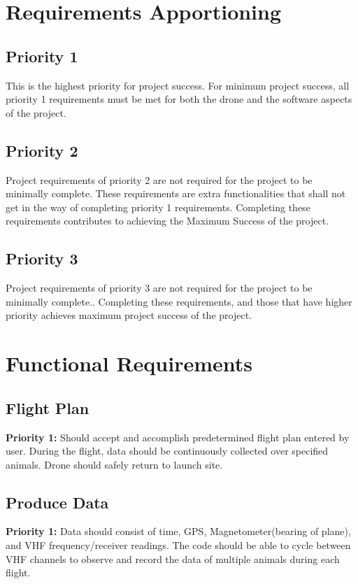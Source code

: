 \documentclass[onecolumn, draftclsnofoot,10pt, compsoc]{IEEEtran}
\begin{document}
\section{Requirements Apportioning}
\subsection{Priority 1}
This is the highest priority for project success. For minimum project success, all priority 1 requirements must be met for both the drone and the software aspects of the project.

\subsection{Priority 2}
Project requirements of priority 2 are not required for the project to be minimally complete. These requirements are extra functionalities that shall not get in the way of completing priority 1 requirements. Completing these requirements contributes to achieving the Maximum Success of the project.

\subsection{Priority 3}
Project requirements of priority 3 are not required for the project to be minimally complete.. Completing these requirements, and those that have higher priority achieves maximum project success of the project.

\section{Functional Requirements}
\subsection{Flight Plan}
\textbf{Priority 1:} Should accept and accomplish predetermined flight plan entered by user. During the flight, data should be continuously collected over specified animals. Drone should safely return to launch site.

\subsection{Produce Data}
\textbf{Priority 1:} Data should consist of time, GPS, Magnetometer(bearing of plane), and VHF frequency/receiver readings. The code should be able to cycle between VHF channels to observe and record the data of multiple animals during each flight.
\end{document}
